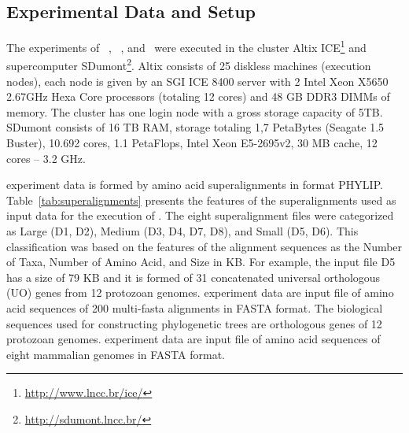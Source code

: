 \subsection{Experimental Data and Setup} \label{expsetup}
The experiments of ~\raxml, ~\sci, and ~\swift were executed in the cluster Altix ICE\footnote{\url{http://www.lncc.br/ice/}} and supercomputer SDumont\footnote{\url{http://sdumont.lncc.br/}}. Altix consists of 25 diskless machines (execution nodes), each node is given by an SGI ICE 8400 server with 2 Intel Xeon X5650 2.67GHz Hexa Core processors (totaling 12 cores) and 48 GB DDR3 DIMMs of memory. The cluster has one login node with a gross storage capacity of 5TB. SDumont consists of 16 TB RAM, storage totaling 1,7 PetaBytes (Seagate 1.5 Buster), 10.692 cores, 1.1 PetaFlops, Intel Xeon E5-2695v2, 30 MB cache, 12 cores – 3.2 GHz.

\underline{\textbf{\raxml}} experiment data is formed by amino acid superalignments in format PHYLIP. Table~\ref{tab:superalignments} presents the features of the superalignments used as input data for the execution of \raxml. The eight superalignment files were categorized as Large (D1, D2), Medium (D3, D4, D7, D8), and Small (D5, D6). This classification was based on the features of the alignment sequences as the Number of Taxa, Number of Amino Acid, and Size in KB. For example, the input file D5 has a size of 79 KB and it is formed of 31 concatenated universal orthologous (UO) genes from 12 protozoan genomes. \underline{\textbf{\sci}} experiment data are input file of amino acid sequences of 200 multi-fasta alignments in FASTA format. The biological sequences used for constructing phylogenetic trees are orthologous genes of 12 protozoan genomes. \underline{\textbf{\swift}} experiment data are input file of amino acid sequences of eight mammalian genomes in FASTA format. 

